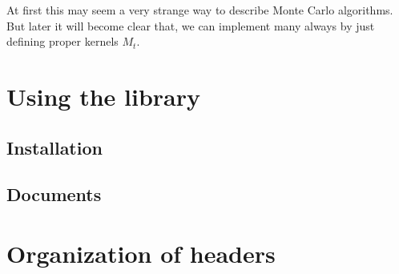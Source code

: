 At first this may seem a very strange way to describe Monte Carlo algorithms.
But later it will become clear that, we can implement many always by just
defining proper kernels $M_t$.

\section{Using the library}
\label{sec:Using the library}

\subsection{Installation}
\label{sub:Installation}

\subsection{Documents}
\label{sub:Documents}

\section{Organization of headers}
\label{sec:Organization of headers}
